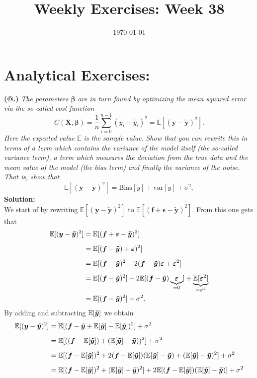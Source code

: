 \documentclass[12pt,
               a4paper,
               article,
               oneside,
               norsk,oldfontcommands]{memoir}
\date{\today}
\title{Weekly Exercises: Week 38}
\makeatletter
\newcommand*{\rom}[1]{\expandafter\@slowromancap\romannumeral #1@}
\newcommand{\spaze}{\vspace{4mm}\\}
\makeatother
\begin{document}
\header{}
\section*{\centering Analytical Exercises:}
\textbf{(\rom{1}.)} \emph{The parameters $\boldsymbol{\beta}$ are in turn found by optimizing the mean
squared error via the so-called cost function}
$$
C(\boldsymbol{X},\boldsymbol{\beta}) =\frac{1}{n}\sum_{i=0}^{n-1}(y_i-\tilde{y}_i)^2=\mathbb{E}\left[(\boldsymbol{y}-\boldsymbol{\tilde{y}})^2\right].
$$
\emph{Here the expected value $\mathbb{E}$ is the sample value.}
\emph{Show that you can rewrite  this in terms of a term which contains the variance of the model itself (the so-called variance term), a
term which measures the deviation from the true data and the mean value of the model (the bias term) and finally the variance of the noise.
That is, show that} 
$$
\mathbb{E}\left[(\boldsymbol{y}-\boldsymbol{\tilde{y}})^2\right]=\mathrm{Bias}[\tilde{y}]+\mathrm{var}[\tilde{y}]+\sigma^2,
$$
\textbf{Solution:} \spaze
We start of by rewriting $\mathbb{E}\left[(\boldsymbol{y}-\boldsymbol{\tilde{y}})^2\right] $ to $ \mathbb{E}\left[(\boldsymbol{f} + \boldsymbol{\epsilon} -\boldsymbol{\tilde{y}})^2\right]$. From this one gets that 
\begin{align*}
        \mathbb{E}[(\boldsymbol{y}-\boldsymbol{\tilde{y}})^2] &= \mathbb{E}[(\bm{f} + \bm{\varepsilon} - \bm{\Tilde{y}})^2] \\[5pt]
        &= \mathbb{E}[(\bm{f} - \bm{\tilde{y}}) + \bm{\varepsilon})^2] \\[5pt]
        &= \mathbb{E}[(\bm{f}-\bm{\Tilde{y}})^2 + 2(\bm{f}-\bm{\Tilde{y}})\bm{\varepsilon} + \bm{\varepsilon}^2] \\[5pt]
        &= \mathbb{E}[(\bm{f}-\bm{\Tilde{y}})^2] + 2\mathbb{E}[(\bm{f}-\bm{\Tilde{y}})\underbrace{\bm{\varepsilon}}_{=0}]+\underbrace{\mathbb{E}[\bm{\varepsilon}^2]}_{= \sigma^2} \\
        &= \mathbb{E}[(\bm{f}-\bm{\Tilde{y}})^2] + \sigma^2 .
\end{align*}
By adding and subtracting $\mathbb{E}[\bm{\Tilde{y}}]$ we obtain
\begin{align*}
         \mathbb{E}[(\bm{y}-\bm{\tilde{y}})^2] &= \mathbb{E}[(\bm{f}-\bm{\Tilde{y}}+ \mathbb{E}[\bm{\tilde{y}}] - \mathbb{E}[\bm{\tilde{y}}])^2]+\sigma^2 \\[5pt]
        &= \mathbb{E}[((\bm{f}- \mathbb{E}[\bm{\tilde{y}}]) + (\mathbb{E}[\bm{\tilde{y}}] -\bm{\Tilde{y}}))^2]+\sigma^2\\[5pt]
        & =\mathbb{E}[(\bm{f}- \mathbb{E}[\bm{\tilde{y}}])^2 + 2(\bm{f}- \mathbb{E}[\bm{\tilde{y}}])(\mathbb{E}[\bm{\tilde{y}}] -\bm{\Tilde{y}}) + (\mathbb{E}[\bm{\tilde{y}}]-\bm{\Tilde{y}})^2] + \sigma^2\\[5pt]
        &= \mathbb{E}[(\bm{f}- \mathbb{E}[\bm{\tilde{y}}])^2 + (\mathbb{E}[\bm{\tilde{y}}]-\bm{\Tilde{y}})^2] + 2\mathbb{E}[(\bm{f}- \mathbb{E}[\bm{\tilde{y}}])(\mathbb{E}[\bm{\tilde{y}}] -\bm{\Tilde{y}})] + \sigma^2
\end{align*}
\end{document}
